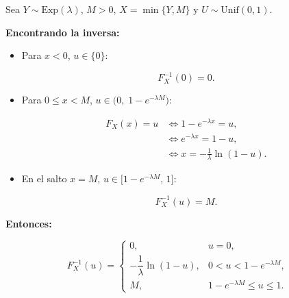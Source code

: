 \documentclass[10pt,a4paper]{article}
\begin{document}
    Sea \(Y\sim\mathrm{Exp}(\lambda)\), \(M>0\), \(X=\min\{Y,M\}\) y
\(U\sim\mathrm{Unif}(0,1)\).

\textbf{Encontrando la inversa:}

\begin{itemize}
\item
  Para \(x<0\), \(u\in\{0\}\):

  \[
  F_X^{-1}(0)=0.
  \]
\item
  Para \(0\le x<M\), \(u\in\big(0,\;1-e^{-\lambda M}\big)\):

  \[
  \begin{aligned}
  F_X(x)=u 
  &\iff 1-e^{-\lambda x}=u,\\
  &\iff e^{-\lambda x}=1-u,\\
  &\iff x=-\frac{1}{\lambda}\ln(1-u).
  \end{aligned}
  \]
\item
  En el salto \(x=M\), \(u\in\big[1-e^{-\lambda M},\,1\big]\):

  \[
  F_X^{-1}(u)=M.
  \]
\end{itemize}

\textbf{Entonces:}

\[
F_X^{-1}(u)=
\begin{cases}
0, & u=0,\\[6pt]
-\dfrac{1}{\lambda}\ln(1-u), & 0<u<1-e^{-\lambda M},\\[10pt]
M, & 1-e^{-\lambda M}\le u\le 1.
\end{cases}
\]
\end{document}
